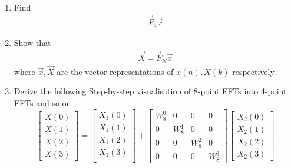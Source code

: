 \documentclass[journal,12pt,twocolumn]{IEEEtran}
\renewcommand\thesection{\arabic{section}}
\begin{document}
\begin{enumerate}[label=\arabic*.,ref=\thesection.\theenumi]
	\item Find 
	\begin{align}
		\vec{P}_4 \vec{x}
	\end{align}
	\item Show that 
	\begin{align}
		\vec{X} = \vec{F}_N \vec{x}
		\label{eq:dft-mat-def}
	\end{align}
	where $\vec{x}, \vec{X}$ are the vector representations of $x(n), X(k)$ respectively.
	\item Derive the following Step-by-step visualisation  of
	8-point FFTs into 4-point FFTs and so on
	\begin{equation}
		\begin{bmatrix}
			X(0) \\ 
			X(1) \\ 
			X(2) \\ 
			X(3)
		\end{bmatrix}
		=
		\begin{bmatrix}
			X_{1}(0) \\ 
			X_{1}(1)\\ 
			X_{1}(2)\\
			X_{1}(3)\\
		\end{bmatrix}
		+
		\begin{bmatrix}
			W^{0}_{8} & 0 & 0 & 0\\
			0 & W^{1}_{8} & 0 & 0\\
			0 & 0 & W^{2}_{8} & 0\\
			0 & 0 & 0 & W^{3}_{8}
		\end{bmatrix}
		\begin{bmatrix}
			X_{2}(0) \\ 
			X_{2}(1) \\ 
			X_{2}(2) \\
			X_{2}(3)
		\end{bmatrix}
	\end{equation}
	

\end{enumerate}
\end{document}
